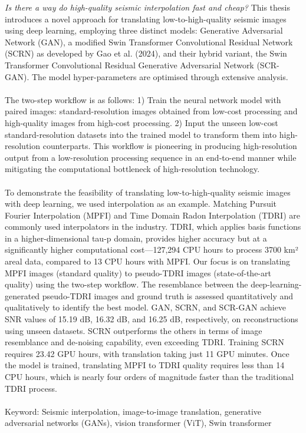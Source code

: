 \textit{Is there a way do high-quality seismic interpolation fast and cheap?}  This thesis introduces a novel approach for translating low-to-high-quality seismic images using deep learning, employing three distinct models: Generative Adversarial Network (GAN), a modified Swin Transformer Convolutional Residual Network (SCRN) as developed by Gao et al. (2024), and their hybrid variant, the Swin Transformer Convolutional Residual Generative Adversarial Network (SCR-GAN). The model hyper-parameters are optimised through extensive analysis.
\\\\
The two-step workflow is as follows: 1) Train the neural network model with paired images: standard-resolution images obtained from low-cost processing and high-quality images from high-cost processing. 2) Input the unseen low-cost standard-resolution datasets into the trained model to transform them into high-resolution counterparts. This workflow is pioneering in producing high-resolution output from a low-resolution processing sequence in an end-to-end manner while mitigating the computational bottleneck of high-resolution technology.
\\\\ 
To demonstrate the feasibility of translating low-to-high-quality seismic images with deep learning, we used interpolation as an example. Matching Pursuit Fourier Interpolation (MPFI) and Time Domain Radon Interpolation (TDRI) are commonly used interpolators in the industry. TDRI, which applies basis functions in a higher-dimensional tau-p domain, provides higher accuracy but at a significantly higher computational cost—127,294 CPU hours to process 3700 km² areal data, compared to 13 CPU hours with MPFI. Our focus is on translating MPFI images (standard quality) to pseudo-TDRI images (state-of-the-art quality) using the two-step workflow. The resemblance between the deep-learning-generated pseudo-TDRI images and ground truth is assessed quantitatively and qualitatively to identify the best model. GAN, SCRN, and SCR-GAN achieve SNR values of 15.19 dB, 16.32 dB, and 16.25 dB, respectively, on reconstructions using unseen datasets. SCRN outperforms the others in terms of image resemblance and de-noising capability, even exceeding TDRI. Training SCRN requires 23.42 GPU hours, with translation taking just 11 GPU minutes. Once the model is trained, translating MPFI to TDRI quality requires less than 14 CPU hours, which is nearly four orders of magnitude faster than the traditional TDRI process.
\\\\
Keyword: Seismic interpolation, image-to-image translation, generative adversarial networks (GANs), vision transformer (ViT), Swin transformer
